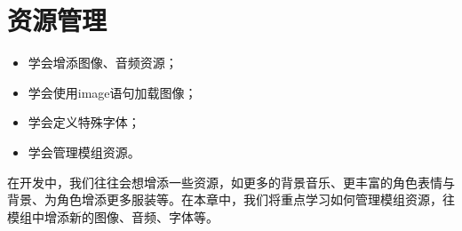 \chapter{资源管理}
\begin{ChapterGoals}
    \begin{itemize}
        \item 学会增添图像、音频资源；
        \item 学会使用image语句加载图像；
        \item 学会定义特殊字体；
        \item 学会管理模组资源。
    \end{itemize}
\end{ChapterGoals}

在开发中，我们往往会想增添一些资源，如更多的背景音乐、更丰富的角色表情与背景、为角色增添更多服装等。在本章中，我们将重点学习如何管理模组资源，往模组中增添新的图像、音频、字体等。

